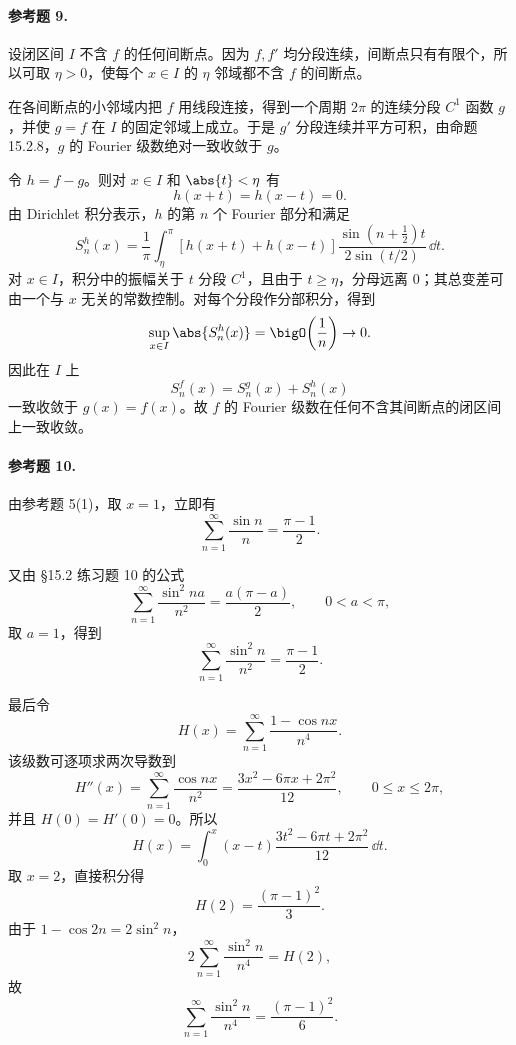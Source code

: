 \paragraph{参考题 9.}
\begin{xsolution}
设闭区间 $I$ 不含 $f$ 的任何间断点。因为 $f,f'$ 均分段连续，间断点只有有限个，所以可取 $\eta>0$，使每个 $x\in I$ 的 $\eta$ 邻域都不含 $f$ 的间断点。

在各间断点的小邻域内把 $f$ 用线段连接，得到一个周期 $2\pi$ 的连续分段 $C^1$ 函数 $g$，并使 $g=f$ 在 $I$ 的固定邻域上成立。于是 $g'$ 分段连续并平方可积，由命题 15.2.8，$g$ 的 Fourier 级数绝对一致收敛于 $g$。

令 $h=f-g$。则对 $x\in I$ 和 $\abs{t}<\eta$ 有
\[
  h(x+t)=h(x-t)=0.
\]
由 Dirichlet 积分表示，$h$ 的第 $n$ 个 Fourier 部分和满足
\[
  S_n^h(x)=\frac1\pi\int_{\eta}^{\pi}
  [h(x+t)+h(x-t)]
  \frac{\sin(n+\frac12)t}{2\sin(t/2)}\,\dd t.
\]
对 $x\in I$，积分中的振幅关于 $t$ 分段 $C^1$，且由于 $t\ge\eta$，分母远离 $0$；其总变差可由一个与 $x$ 无关的常数控制。对每个分段作分部积分，得到
\[
  \sup_{x\in I}\abs{S_n^h(x)}=\bigO\!\left(\frac1n\right)\to0.
\]
因此在 $I$ 上
\[
  S_n^f(x)=S_n^g(x)+S_n^h(x)
\]
一致收敛于 $g(x)=f(x)$。故 $f$ 的 Fourier 级数在任何不含其间断点的闭区间上一致收敛。
\end{xsolution}

\paragraph{参考题 10.}
\begin{xsolution}
由参考题 5(1)，取 $x=1$，立即有
\[
  \boxed{\displaystyle
  \sum_{n=1}^{\infty}\frac{\sin n}{n}=\frac{\pi-1}{2}}.
\]

又由 §15.2 练习题 10 的公式
\[
  \sum_{n=1}^{\infty}\frac{\sin^2na}{n^2}=\frac{a(\pi-a)}2,
  \qquad0<a<\pi,
\]
取 $a=1$，得到
\[
  \boxed{\displaystyle
  \sum_{n=1}^{\infty}\frac{\sin^2n}{n^2}=\frac{\pi-1}{2}}.
\]

最后令
\[
  H(x)=\sum_{n=1}^{\infty}\frac{1-\cos nx}{n^4}.
\]
该级数可逐项求两次导数到
\[
  H''(x)=\sum_{n=1}^{\infty}\frac{\cos nx}{n^2}
  =\frac{3x^2-6\pi x+2\pi^2}{12},
  \qquad0\le x\le2\pi,
\]
并且 $H(0)=H'(0)=0$。所以
\[
  H(x)=\int_0^x(x-t)
  \frac{3t^2-6\pi t+2\pi^2}{12}\,\dd t.
\]
取 $x=2$，直接积分得
\[
  H(2)=\frac{(\pi-1)^2}{3}.
\]
由于 $1-\cos2n=2\sin^2n$，
\[
  2\sum_{n=1}^{\infty}\frac{\sin^2n}{n^4}=H(2),
\]
故
\[
  \boxed{\displaystyle
  \sum_{n=1}^{\infty}\frac{\sin^2n}{n^4}=\frac{(\pi-1)^2}{6}}.
\]
\end{xsolution}

